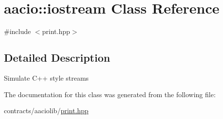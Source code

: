 \hypertarget{classaacio_1_1iostream}{}\section{aacio\+:\+:iostream Class Reference}
\label{classaacio_1_1iostream}


{\ttfamily \#include $<$print.\+hpp$>$}



\subsection{Detailed Description}
Simulate C++ style streams 

The documentation for this class was generated from the following file\+:\begin{DoxyCompactItemize}
\item 
contracts/aaciolib/\mbox{\hyperlink{print_8hpp}{print.\+hpp}}\end{DoxyCompactItemize}
